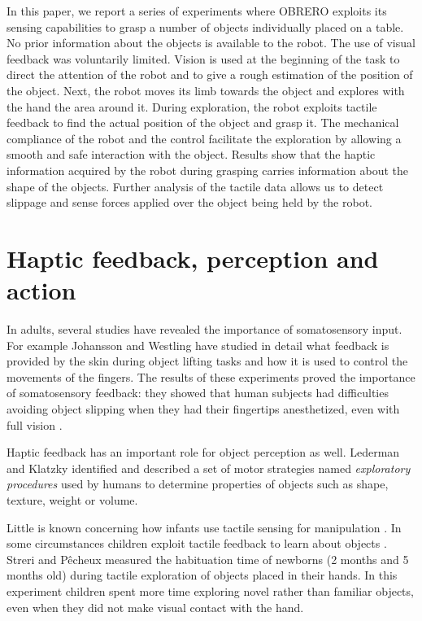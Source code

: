 In this paper, we report a series of experiments where OBRERO
exploits its sensing capabilities to grasp a number of objects
individually placed on a table. No prior information about the
objects is available to the robot. The use of visual feedback was
voluntarily limited. Vision is used at the beginning of the task
to direct the attention of the robot and to give a rough
estimation of the position of the object. Next, the robot moves
its limb towards the object and explores with the hand the area
around it. During exploration, the robot exploits tactile feedback
to find the actual position of the object and grasp it. The
mechanical compliance of the robot and the control facilitate the
exploration by allowing a smooth and safe interaction with the
object. Results show that the haptic information acquired by the
robot during grasping carries information about the shape of the
objects. Further analysis of the tactile data allows us to detect
slippage and sense forces applied over the object being held by
the robot.

\section{Haptic feedback, perception and action}
\label{sec:background}

In adults, several studies have revealed the importance of
somatosensory input. For example Johansson and Westling
\cite{Johansson90Tactile} have studied in detail what feedback is
provided by the skin during object lifting tasks and how it is
used to control the movements of the fingers. The results of these
experiments proved the importance of somatosensory feedback: they
showed that human subjects had difficulties avoiding object
slipping when they had their fingertips anesthetized, even with
full vision \cite{johansson91how}.

Haptic feedback has an important role for object perception as
well. Lederman and Klatzky \cite{lederman87hand} identified and
described a set of motor strategies named \emph{exploratory
procedures} used by humans to determine properties of objects such
as shape, texture, weight or volume.

Little is known concerning how infants use tactile sensing for
manipulation \cite{streri93Seeing}.
In some circumstances children exploit tactile feedback to learn
about objects \cite{streri86Habituation}. Streri and P\^{e}cheux
measured the habituation time of newborns (2 months and 5 months
old) during tactile exploration of objects placed in their hands.
In this experiment children spent more time exploring novel rather
than familiar objects, even when they did not make visual contact
with the hand. %

